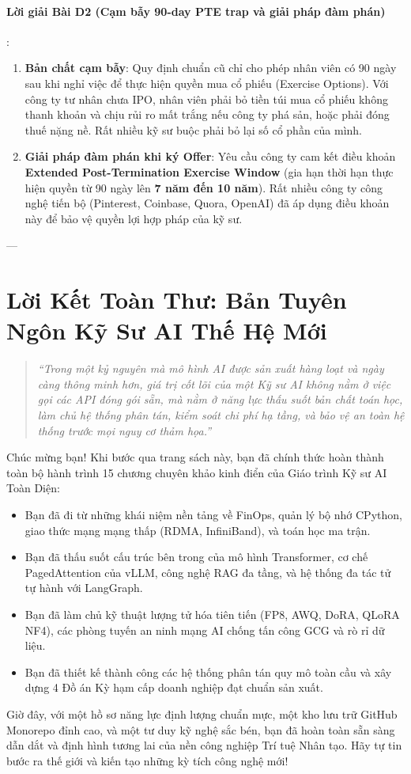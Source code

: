\paragraph{Lời giải Bài D2 (Cạm bẫy 90-day PTE trap và giải pháp đàm phán)}:
\begin{enumerate}
  \item \textbf{Bản chất cạm bẫy}: Quy định chuẩn cũ chỉ cho phép nhân viên có 90 ngày sau khi nghỉ việc để thực hiện quyền mua cổ phiếu (Exercise Options). Với công ty tư nhân chưa IPO, nhân viên phải bỏ tiền túi mua cổ phiếu không thanh khoản và chịu rủi ro mất trắng nếu công ty phá sản, hoặc phải đóng thuế nặng nề. Rất nhiều kỹ sư buộc phải bỏ lại số cổ phần của mình.
  \item \textbf{Giải pháp đàm phán khi ký Offer}:
  Yêu cầu công ty cam kết điều khoản \textbf{Extended Post-Termination Exercise Window} (gia hạn thời hạn thực hiện quyền từ 90 ngày lên \textbf{7 năm đến 10 năm}). Rất nhiều công ty công nghệ tiến bộ (Pinterest, Coinbase, Quora, OpenAI) đã áp dụng điều khoản này để bảo vệ quyền lợi hợp pháp của kỹ sư.
\end{enumerate}

---

\section{Lời Kết Toàn Thư: Bản Tuyên Ngôn Kỹ Sư AI Thế Hệ Mới}
\label{sec:ch15-epilogue}

\begin{quote}
\large\itshape
``Trong một kỷ nguyên mà mô hình AI được sản xuất hàng loạt và ngày càng thông minh hơn, giá trị cốt lõi của một Kỹ sư AI không nằm ở việc gọi các API đóng gói sẵn, mà nằm ở năng lực thấu suốt bản chất toán học, làm chủ hệ thống phân tán, kiểm soát chi phí hạ tầng, và bảo vệ an toàn hệ thống trước mọi nguy cơ thảm họa.''
\end{quote}

Chúc mừng bạn! Khi bước qua trang sách này, bạn đã chính thức hoàn thành toàn bộ hành trình 15 chương chuyên khảo kinh điển của Giáo trình Kỹ sư AI Toàn Diện:
\begin{itemize}
  \item Bạn đã đi từ những khái niệm nền tảng về FinOps, quản lý bộ nhớ CPython, giao thức mạng mạng thấp (RDMA, InfiniBand), và toán học ma trận.
  \item Bạn đã thấu suốt cấu trúc bên trong của mô hình Transformer, cơ chế PagedAttention của vLLM, công nghệ RAG đa tầng, và hệ thống đa tác tử tự hành với LangGraph.
  \item Bạn đã làm chủ kỹ thuật lượng tử hóa tiên tiến (FP8, AWQ, DoRA, QLoRA NF4), các phòng tuyến an ninh mạng AI chống tấn công GCG và rò rỉ dữ liệu.
  \item Bạn đã thiết kế thành công các hệ thống phân tán quy mô toàn cầu và xây dựng 4 Đồ án Kỳ hạm cấp doanh nghiệp đạt chuẩn sản xuất.
\end{itemize}

Giờ đây, với một hồ sơ năng lực định lượng chuẩn mực, một kho lưu trữ GitHub Monorepo đỉnh cao, và một tư duy kỹ nghệ sắc bén, bạn đã hoàn toàn sẵn sàng dẫn dắt và định hình tương lai của nền công nghiệp Trí tuệ Nhân tạo. Hãy tự tin bước ra thế giới và kiến tạo những kỳ tích công nghệ mới!

